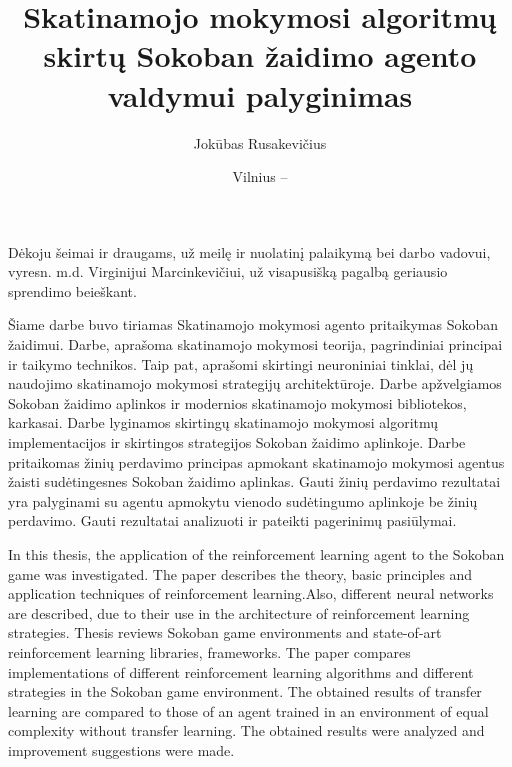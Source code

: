 \documentclass{VUMIFPSbakalaurinis}
\title{Skatinamojo mokymosi algoritmų skirtų Sokoban žaidimo agento valdymui palyginimas}
\author{Jokūbas Rusakevičius}
\date{Vilnius – \the\year}
\begin{document}
\maketitle
\setcounter{page}{2}

\sectionnonumnocontent{}
\vspace{7cm}
\begin{center}
Dėkoju šeimai ir draugams, už meilę ir nuolatinį palaikymą bei darbo vadovui, vyresn. m.d. Virginijui Marcinkevičiui, už visapusišką pagalbą geriausio sprendimo beieškant.
\end{center}


Šiame darbe buvo tiriamas Skatinamojo mokymosi agento pritaikymas Sokoban žaidimui. Darbe, aprašoma skatinamojo mokymosi teorija, pagrindiniai principai ir taikymo technikos. Taip pat, aprašomi skirtingi neuroniniai tinklai, dėl jų naudojimo skatinamojo mokymosi strategijų architektūroje. Darbe apžvelgiamos Sokoban žaidimo aplinkos ir modernios skatinamojo mokymosi bibliotekos, karkasai. Darbe lyginamos skirtingų skatinamojo mokymosi algoritmų implementacijos ir skirtingos strategijos Sokoban žaidimo aplinkoje. Darbe pritaikomas žinių perdavimo principas apmokant skatinamojo mokymosi agentus žaisti sudėtingesnes Sokoban žaidimo aplinkas. Gauti žinių perdavimo rezultatai yra palyginami su agentu apmokytu vienodo sudėtingumo aplinkoje be žinių perdavimo. Gauti rezultatai analizuoti ir pateikti pagerinimų pasiūlymai.

In this thesis, the application of the reinforcement learning agent to the Sokoban game was investigated. The paper describes the theory, basic principles and application techniques of reinforcement learning.Also, different neural networks are described, due to their use in the architecture of reinforcement learning strategies. Thesis reviews Sokoban game environments and state-of-art reinforcement learning libraries, frameworks. The paper compares implementations of different reinforcement learning algorithms and different strategies in the Sokoban game environment. The obtained results of transfer learning are compared to those of an agent trained in an environment of equal complexity without transfer learning. The obtained results were analyzed and improvement suggestions were made.
\end{document}

